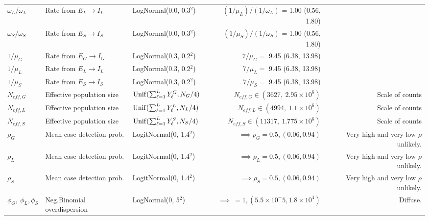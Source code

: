\begin{table}
\begin{fullpage}
\begin{tabular}{lllrr}
			$ \omega_L/\omega_L $ & Rate from $ E_L\rightarrow I_L $ & LogNormal(0.0, 0.3$ ^2 $) & $ (1/\mu_L)\big/(1/\omega_L) $ = 1.00 (0.56, 1.80) & \cite{chowell2014transmission,velasquez2015time,glynn2017variability} \\
			$ \omega_S/\omega_S $ & Rate from $ E_S\rightarrow I_S $ & LogNormal(0.0, 0.3$ ^2 $) & $ (1/\mu_S)\big/(1/\omega_S) $ = 1.00 (0.56, 1.80) & \cite{chowell2014transmission,velasquez2015time,glynn2017variability} \\
			$ 1/\mu_G $ & Rate from $ E_G\rightarrow I_G $ &  LogNormal(0.3, 0.2$ ^2 $) & $ 7/\mu_G = $ 9.45 (6.38, 13.98) & \cite{chowell2014transmission,velasquez2015time,glynn2017variability} \\
			$ 1/\mu_L $ & Rate from $ E_L\rightarrow I_L $ &  LogNormal(0.3, 0.2$ ^2 $) & $ 7/\mu_L = $ 9.45 (6.38, 13.98) & \cite{chowell2014transmission,velasquez2015time,glynn2017variability} \\
			$ 1/\mu_S $ & Rate from $ E_S\rightarrow I_S $ &  LogNormal(0.3, 0.2$ ^2 $) & $ 7/\mu_S = $ 9.45 (6.38, 13.98) & \cite{chowell2014transmission,velasquez2015time,glynn2017variability} \\
			$ N_{eff,G} $ & Effective population size & $\mathrm{Unif}(\sum_{\ell=1}^{L}Y_\ell^G, N_G/4) $& $ N_{eff,G} \in (3627,\ 2.95\times10^6) $ & Scale of counts \\
			$ N_{eff,L} $ & Effective population size & $\mathrm{Unif}(\sum_{\ell=1}^{L}Y_\ell^L, N_L/4) $& $ N_{eff,L} \in (4994,\ 1.1\times10^6) $ & Scale of counts \\
			$ N_{eff,S} $ & Effective population size & $\mathrm{Unif}(\sum_{\ell=1}^{L}Y_\ell^S, N_S/4) $& $ N_{eff,S} \in (11317,\ 1.775\times10^6) $ & Scale of counts \\
			$ \rho_G $ &  Mean case detection prob. & LogitNormal(0, 1.4$ ^2 $) & $ \implies \rho_G = 0.5, (0.06, 0.94)$ & Very high and very low $ \rho $ unlikely. \\
			$ \rho_L $ &  Mean case detection prob. & LogitNormal(0, 1.4$ ^2 $) & $ \implies \rho_L = 0.5, (0.06, 0.94)$ & Very high and very low $ \rho $ unlikely. \\
			$ \rho_S $ & Mean case detection prob. & LogitNormal(0, 1.4$ ^2 $) & $ \implies \rho_S = 0.5, (0.06, 0.94)$ & Very high and very low $ \rho $ unlikely. \\
			$ \phi_G,\ \phi_L, \phi_S $ &  Neg.Binomial overdispersion & LogNormal(0, 5$ ^2 $) & $ \implies \ = 1, (5.5\times 10^-5, 1.8\times10^4)$ & Diffuse. \\
			\hline
		\end{tabular}
	\end{fullpage}
\end{table}

